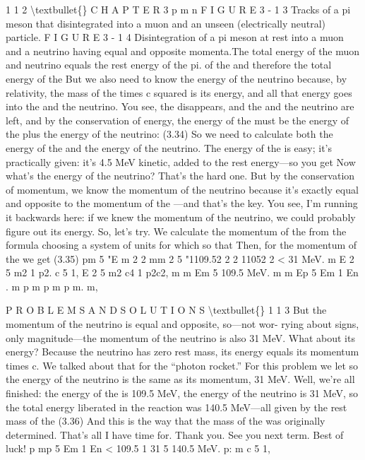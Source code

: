 \documentclass[10pt,oneside]{article}
\begin{document}
1 1 2 \textbackslash{}textbullet\{\} C H A P T E R  3 p m n F I G U R E  3 - 1 3 Tracks of a pi meson that disintegrated into a muon and an unseen (electrically neutral) particle. F I G U R E  3 - 1 4 Disintegration of a pi meson at rest into a muon and a neutrino having equal and opposite momenta.The total energy of the muon and neutrino equals the rest energy of the pi. of the and therefore the total energy of the But we also need to know the energy of the neutrino because, by relativity, the mass of the times c squared is its energy, and all that energy goes into the and the neutrino. You see, the disappears, and the and the neutrino are left, and by the conservation of energy, the energy of the must be the energy of the plus the energy of the neutrino: (3.34) So we need to calculate both the energy of the and the energy of the neutrino. The energy of the is easy; it’s practically given: it’s 4.5 MeV kinetic, added to the rest energy---so you get Now what’s the energy of the neutrino? That’s the hard one. But by the conservation of momentum, we know the momentum of the neutrino because it’s exactly equal and opposite to the momentum of the ---and that’s the key. You see, I’m running it backwards here: if we knew the momentum of the neutrino, we could probably figure out its energy. So, let’s try. We calculate the momentum of the from the formula choosing a system of units for which so that Then, for the momentum of the we get (3.35) pm 5 "E m 2 2 mm 2 5 "1109.52 2 2 11052 2 < 31 MeV. m E 2 5 m2 1 p2. c 5 1, E 2 5 m2 c4 1 p2c2, m m Em 5 109.5 MeV. m m Ep 5 Em 1 En . m p m p m p m. m,\par

P R O B L E M S  A N D  S O L U T I O N S \textbackslash{}textbullet\{\} 1 1 3 But the momentum of the neutrino is equal and opposite, so---not wor- rying about signs, only magnitude---the momentum of the neutrino is also 31 MeV. What about its energy? Because the neutrino has zero rest mass, its energy equals its momentum times c. We talked about that for the “photon rocket.” For this problem we let so the energy of the neutrino is the same as its momentum, 31 MeV. Well, we’re all finished: the energy of the is 109.5 MeV, the energy of the neutrino is 31 MeV, so the total energy liberated in the reaction was 140.5 MeV---all given by the rest mass of the (3.36) And this is the way that the mass of the was originally determined. That’s all I have time for. Thank you. See you next term. Best of luck! p mp 5 Em 1 En < 109.5 1 31 5 140.5 MeV. p: m c 5 1,\par
\end{document}
